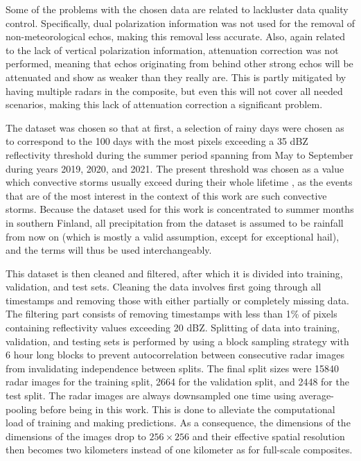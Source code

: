 Some of the problems with the chosen data are related to lackluster data quality control. Specifically, dual polarization information was not used for the removal of non-meteorological echos, making this removal less accurate. Also, again related to the lack of vertical polarization information, attenuation correction was not performed, meaning that echos originating from behind other strong echos will be attenuated and show as weaker than they really are. This is partly mitigated by having multiple radars in the composite, but even this will not cover all needed scenarios, making this lack of attenuation correction a significant problem. 



The dataset was chosen so that at first, a selection of rainy days were chosen as to correspond to the 100 days with the most pixels exceeding a 35 dBZ reflectivity threshold during the summer period spanning from May to September during years 2019, 2020, and 2021. The present threshold was chosen as a value which convective storms usually exceed during their whole lifetime \cite{voormansik_thunderstorm_2017}, as the events that are of the most interest in the context of this work are such convective storms. Because the dataset used for this work is concentrated to summer months in southern Finland, all precipitation from the dataset is assumed to be rainfall from now on (which is mostly a valid assumption, except for exceptional hail), and the terms will thus be used interchangeably. 

This dataset is then cleaned and filtered, after which it is divided into training, validation, and test sets. Cleaning the data involves first going through all timestamps and removing those with either partially or completely missing data. The filtering part consists of removing timestamps with less than 1\% of pixels containing reflectivity values exceeding 20 dBZ. Splitting of data into training, validation, and testing sets is performed by using a block sampling strategy \cite{schultz_can_2021} with 6 hour long blocks to prevent autocorrelation between consecutive radar images from invalidating independence between splits. The final split sizes were 15840 radar images for the training split, 2664 for the validation split, and 2448 for the test split. The radar images are always downsampled one time using average-pooling before being in this work. This is done to alleviate the computational load of training and making predictions. As a consequence, the dimensions of the dimensions of the images drop to $256 \times 256$ and their effective spatial resolution then becomes two kilometers instead of one kilometer as for full-scale composites. 

